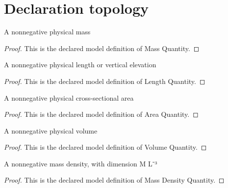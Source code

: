 \section{Declaration topology}
\begin{definition}
  \label{def:physics:phyx-mini-0389:phyxminiproblems-problemphyxmini0389-massquantity}
  A nonnegative physical mass
\end{definition}
\begin{proof}
  This is the declared model definition of Mass Quantity.
\end{proof}
\begin{definition}
  \label{def:physics:phyx-mini-0389:phyxminiproblems-problemphyxmini0389-lengthquantity}
  A nonnegative physical length or vertical elevation
\end{definition}
\begin{proof}
  This is the declared model definition of Length Quantity.
\end{proof}
\begin{definition}
  \label{def:physics:phyx-mini-0389:phyxminiproblems-problemphyxmini0389-areaquantity}
  A nonnegative physical cross-sectional area
\end{definition}
\begin{proof}
  This is the declared model definition of Area Quantity.
\end{proof}
\begin{definition}
  \label{def:physics:phyx-mini-0389:phyxminiproblems-problemphyxmini0389-volumequantity}
  A nonnegative physical volume
\end{definition}
\begin{proof}
  This is the declared model definition of Volume Quantity.
\end{proof}
\begin{definition}
  \label{def:physics:phyx-mini-0389:phyxminiproblems-problemphyxmini0389-massdensityquantity}
  A nonnegative mass density, with dimension M L⁻³
\end{definition}
\begin{proof}
  This is the declared model definition of Mass Density Quantity.
\end{proof}
